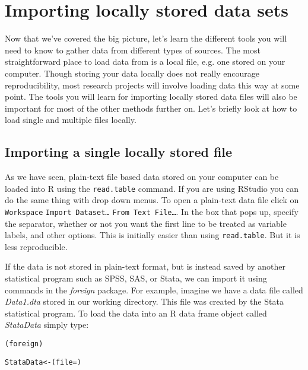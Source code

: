 \section{Importing locally stored data sets}

Now that we've covered the big picture, let's learn the different tools you will need to know to gather data from different types of sources. The most straightforward place to load data from is a local file, e.g. one stored on your computer. Though storing your data locally does not really encourage reproducibility, most research projects will involve loading data this way at some point. The tools you will learn for importing locally stored data files will also be important for most of the other methods further on. Let's briefly look at how to load single and multiple files locally.

\subsection{Importing a single locally stored file}

As we have seen, plain-text file based data stored on your computer can be loaded into R using the \texttt{read.table} command. If you are using RStudio you can do the same thing with drop down menus. To open a plain-text data file click on \texttt{Workspace} \textrightarrow\: \texttt{Import Dataset\ldots} \textrightarrow\: \texttt{From Text File\ldots}. In the box that pops up, specify the separator, whether or not you want the first line to be treated as variable labels, and other options. This is initially easier than using \texttt{read.table}. But it is less reproducible.

If the data is not stored in plain-text format, but is instead saved by another statistical program such as SPSS, SAS, or Stata, we can import it using commands in the \emph{foreign} package. For example, imagine we have a data file called \emph{Data1.dta} stored in our working directory. This file was created by the Stata statistical program. To load the data into an R data frame object called \emph{StataData} simply type:

\begin{knitrout}
\color{fgcolor}\begin{kframe}
\begin{alltt}
(foreign)

StataData <- (file = )
\end{alltt}
\end{kframe}
\end{knitrout}


